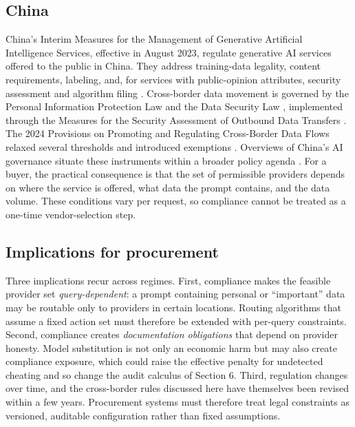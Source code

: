 \documentclass[sigconf]{acmart}
\begin{document}
\subsection{China}\label{china}

China's Interim Measures for the Management of Generative Artificial Intelligence Services, effective in August 2023, regulate generative AI services offered to the public in China. They address training-data legality, content requirements, labeling, and, for services with public-opinion attributes, security assessment and algorithm filing \cite{cac2023genai}. Cross-border data movement is governed by the Personal Information Protection Law \cite{npc2021pipl} and the Data Security Law \cite{npc2021dsl}, implemented through the Measures for the Security Assessment of Outbound Data Transfers \cite{cac2022assessment}. The 2024 Provisions on Promoting and Regulating Cross-Border Data Flows relaxed several thresholds and introduced exemptions \cite{cac2024crossborder}. Overviews of China's AI governance situate these instruments within a broader policy agenda \cite{roberts2021chinese}. For a buyer, the practical consequence is that the set of permissible providers depends on where the service is offered, what data the prompt contains, and the data volume. These conditions vary per request, so compliance cannot be treated as a one-time vendor-selection step.

\subsection{Implications for procurement}\label{implications-for-procurement}

Three implications recur across regimes. First, compliance makes the feasible provider set \emph{query-dependent}: a prompt containing personal or ``important'' data may be routable only to providers in certain locations. Routing algorithms that assume a fixed action set must therefore be extended with per-query constraints. Second, compliance creates \emph{documentation obligations} that depend on provider honesty. Model substitution is not only an economic harm but may also create compliance exposure, which could raise the effective penalty for undetected cheating and so change the audit calculus of Section 6. Third, regulation changes over time, and the cross-border rules discussed here have themselves been revised within a few years. Procurement systems must therefore treat legal constraints as versioned, auditable configuration rather than fixed assumptions.
\end{document}
